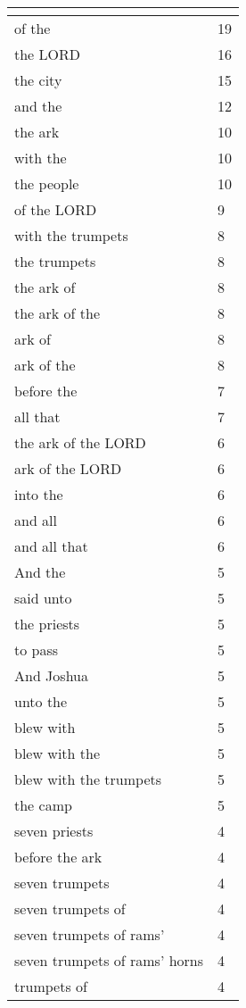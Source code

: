 \begin{center}
\begin{longtable}{|p{3.0in}|p{0.5in}|}
\hline \multicolumn{2}{c}{{ }} \\ \hline
\endfoot 
of the & 19\\ \hline 
the LORD & 16\\ \hline 
the city & 15\\ \hline 
and the & 12\\ \hline 
the ark & 10\\ \hline 
with the & 10\\ \hline 
the people & 10\\ \hline 
of the LORD & 9\\ \hline 
with the trumpets & 8\\ \hline 
the trumpets & 8\\ \hline 
the ark of & 8\\ \hline 
the ark of the & 8\\ \hline 
ark of & 8\\ \hline 
ark of the & 8\\ \hline 
before the & 7\\ \hline 
all that & 7\\ \hline 
the ark of the LORD & 6\\ \hline 
ark of the LORD & 6\\ \hline 
into the & 6\\ \hline 
and all & 6\\ \hline 
and all that & 6\\ \hline 
And the & 5\\ \hline 
said unto & 5\\ \hline 
the priests & 5\\ \hline 
to pass & 5\\ \hline 
And Joshua & 5\\ \hline 
unto the & 5\\ \hline 
blew with & 5\\ \hline 
blew with the & 5\\ \hline 
blew with the trumpets & 5\\ \hline 
the camp & 5\\ \hline 
seven priests & 4\\ \hline 
before the ark & 4\\ \hline 
seven trumpets & 4\\ \hline 
seven trumpets of & 4\\ \hline 
seven trumpets of rams' & 4\\ \hline 
seven trumpets of rams' horns & 4\\ \hline 
trumpets of & 4\\ \hline 

\end{longtable}
\end{center}
